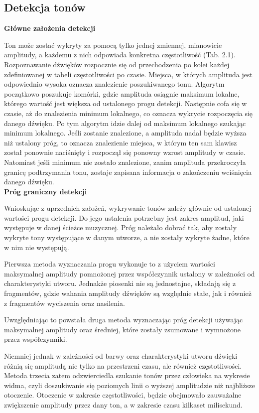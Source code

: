 \subsection{Detekcja tonów}

\noindent\textbf{Główne założenia detekcji}

Ton może zostać wykryty za pomocą tylko jednej zmiennej, mianowicie amplitudy, a każdemu z nich odpowiada konkretna częstotliwość (Tab. 2.1). Rozpoznawanie dźwięków rozpocznie się od przechodzenia po kolei każdej zdefiniowanej w tabeli częstotliwości po czasie. Miejsca, w których amplituda jest odpowiednio wysoka oznacza znalezienie poszukiwanego tonu. Algorytm początkowo poszukuje komórki, gdzie amplituda osiągnie maksimum lokalne, którego wartość jest większa od ustalonego progu detekcji. Następnie cofa się w czasie, aż do znalezienia minimum lokalnego, co oznacza wykrycie rozpoczęcia się danego dźwięku. Po tym algorytm idzie dalej od maksimum lokalnego szukając minimum lokalnego. Jeśli zostanie znalezione, a amplituda nadal będzie wyższa niż ustalony próg, to oznacza znalezienie miejsca, w którym ten sam klawisz został ponownie naciśnięty i rozpoczął się ponowny wzrost amplitudy w czasie. Natomiast jeśli minimum nie zostało znalezione, zanim amplituda przekroczyła granicę podtrzymania tonu, zostaje zapisana informacja o zakończeniu wciśnięcia danego dźwięku.\\




\noindent\textbf{Próg graniczny detekcji}

Wnioskując z uprzednich założeń, wykrywanie tonów zależy głównie od ustalonej wartości progu detekcji. Do jego ustalenia potrzebny jest zakres amplitud, jaki występuje w danej ścieżce muzycznej. Próg należało dobrać tak, aby zostały wykryte tony występujące w danym utworze, a nie zostały wykryte żadne, które w nim nie występują. 

Pierwsza metoda wyznaczania progu wykonuje to z użyciem wartości maksymalnej amplitudy pomnożonej przez współczynnik ustalony w zależności od charakterystyki utworu. 
Jednakże piosenki nie są jednostajne, składają się z fragmentów, gdzie wahania amplitudy dźwięków są względnie stałe, jak i również z fragmentów wyciszenia oraz nasilenia. 

Uwzględniając to powstała druga metoda wyznaczając próg detekcji używając maksymalnej amplitudy oraz średniej, które zostały zsumowane i wymnożone przez współczynniki.

Niemniej jednak w zależności od barwy oraz charakterystyki utworu dźwięki różnią się amplitudą nie tylko na przestrzeni czasu, ale również częstotliwości. Metoda trzecia zatem odzwierciedla szukanie tonów przez człowieka na wykresie widma, czyli doszukiwanie się poziomych linii o wyższej amplitudzie niż najbliższe otoczenie. Otoczenie w zakresie częstotliwości, będzie obejmowało zauważalne zwiększenie amplitudy przez dany ton, a w zakresie czasu kilkaset milisekund.\\

